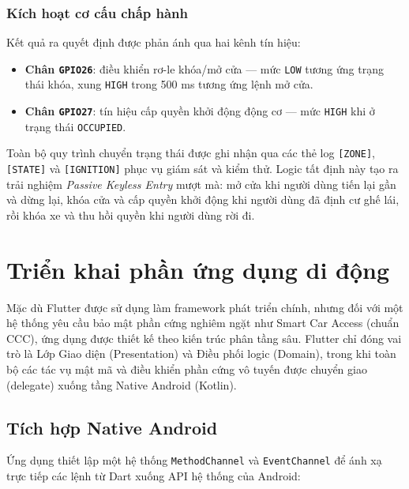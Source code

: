 \subsubsection{Kích hoạt cơ cấu chấp hành}

Kết quả ra quyết định được phản ánh qua hai kênh tín hiệu:

\begin{itemize}
    \item \textbf{Chân \texttt{GPIO26}}: điều khiển rơ-le khóa/mở cửa --- mức \texttt{LOW} tương ứng trạng thái khóa, xung \texttt{HIGH} trong 500 ms tương ứng lệnh mở cửa.
    \item \textbf{Chân \texttt{GPIO27}}: tín hiệu cấp quyền khởi động động cơ --- mức \texttt{HIGH} khi ở trạng thái \texttt{OCCUPIED}.
\end{itemize}

Toàn bộ quy trình chuyển trạng thái được ghi nhận qua các thẻ log \texttt{[ZONE]}, \texttt{[STATE]} và \texttt{[IGNITION]} phục vụ giám sát và kiểm thử. Logic tất định này tạo ra trải nghiệm \textit{Passive Keyless Entry} mượt mà: mở cửa khi người dùng tiến lại gần và dừng lại, khóa cửa và cấp quyền khởi động khi người dùng đã định cư ghế lái, rồi khóa xe và thu hồi quyền khi người dùng rời đi.












\section{Triển khai phần ứng dụng di động}

Mặc dù Flutter được sử dụng làm framework phát triển chính, nhưng đối với một hệ thống yêu cầu bảo mật phần cứng nghiêm ngặt như Smart Car Access (chuẩn CCC), ứng dụng được thiết kế theo kiến trúc phân tầng sâu. Flutter chỉ đóng vai trò là Lớp Giao diện (Presentation) và Điều phối logic (Domain), trong khi toàn bộ các tác vụ mật mã và điều khiển phần cứng vô tuyến được chuyển giao (delegate) xuống tầng Native Android (Kotlin).

\subsection{Tích hợp Native Android}
Ứng dụng thiết lập một hệ thống \texttt{MethodChannel} và \texttt{EventChannel} để ánh xạ trực tiếp các lệnh từ Dart xuống API hệ thống của Android:

